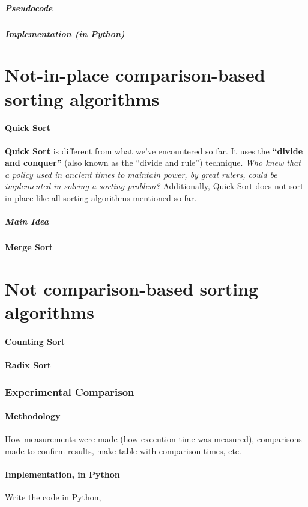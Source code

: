 \documentclass[a4paper]{article}
\begin{document}
                \subsubsection*{Pseudocode}
                \subsubsection*{Implementation (in Python)}
        \part{Not-in-place comparison-based sorting algorithms}
            \subsection{Quick Sort}
            \textbf{Quick Sort} is different from what we've encountered so far. 
            It uses the \textbf{“divide and conquer”} 
            (also known as the “divide and rule”) 
            technique. \textit{Who knew that a policy used in ancient times to maintain power, 
            by great rulers, could be implemented in solving a sorting problem?}
            Additionally, Quick Sort does not sort in place like all sorting algorithms mentioned so far.
            
            
                \subsubsection*{Main Idea}



            \subsection{Merge Sort}
        \part{Not comparison-based sorting algorithms}
            \subsection{Counting Sort}
            \subsection{Radix Sort}
        

    \section{Experimental Comparison}
        \subsection{Methodology}
            How measurements were made (how execution time was measured), comparisons made to
            confirm results, make table with comparison times, etc.
        \subsection{Implementation, in Python}
            Write the code in Python,
\end{document}
